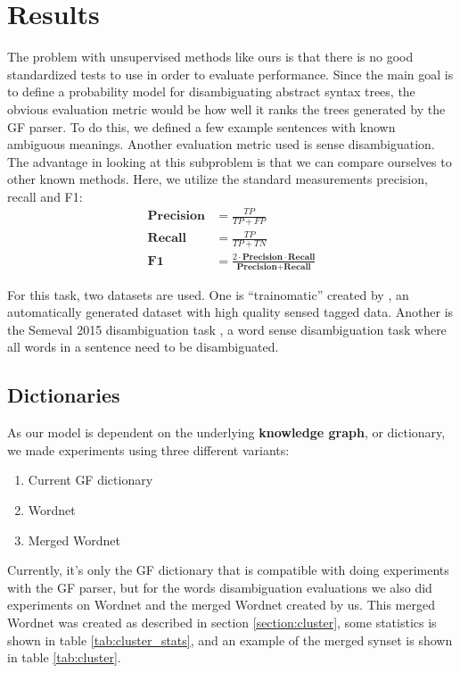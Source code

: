 \chapter{Results}
\label{chapter:results}
The problem with unsupervised methods like ours is that there is no good standardized tests to use in order to evaluate performance. Since the main goal is to define a probability model for disambiguating abstract syntax trees, the obvious evaluation metric would be how well it ranks the trees generated by the GF parser. To do this, we defined a few example sentences with known ambiguous meanings. Another evaluation metric used is sense disambiguation. The advantage in looking at this subproblem is that we can compare ourselves to other known methods. Here, we utilize the standard measurements precision, recall and F1: 
\begin{align*}
 \textbf{Precision} &= \frac{TP}{TP+FP} \\[1em]
 \textbf{Recall} &= \frac{TP}{TP+TN} \\[1em]
 \textbf{F1} &= \frac{2\cdot \textbf{Precision} \cdot \textbf{Recall}}{\textbf{Precision} + \textbf{Recall}}
\end{align*}

For this task, two datasets are used. One is ``trainomatic'' created by \citet{pasini2017trainomatic}, an automatically generated dataset with high quality sensed tagged data. Another is the Semeval 2015 disambiguation task \citep{moro2015semeval}, a word sense disambiguation task where all words in a sentence need to be disambiguated.

\section{Dictionaries}
As our model is dependent on the underlying \textbf{knowledge graph}, or dictionary, we made experiments using three different variants:

\begin{enumerate}
    \item Current GF dictionary
    \item Wordnet
    \item Merged Wordnet
\end{enumerate}
Currently, it's only the GF dictionary that is compatible with doing experiments with the GF parser, but for the words disambiguation evaluations we also did experiments on Wordnet and the merged Wordnet created by us. This merged Wordnet was created as described in section \ref{section:cluster}, some statistics is shown in table \ref{tab:cluster_stats}, and an example of the merged synset is shown in table \ref{tab:cluster}. 


